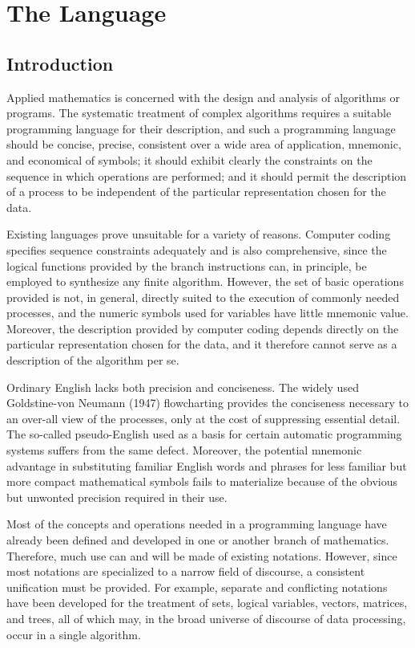 
\chapter{The Language}

\section{Introduction}

\par Applied mathematics is concerned with the design and analysis of algorithms or programs. The systematic treatment of complex algorithms requires a suitable programming language for their description, and such a programming language should be concise, precise, consistent over a wide area of application, mnemonic, and economical of symbols; it should exhibit clearly the constraints on the sequence in which operations are performed; and it should permit the description of a process to be independent of the particular representation chosen for the data.

\par Existing languages prove unsuitable for a variety of reasons. Computer coding specifies sequence constraints adequately and is also comprehensive, since the logical functions provided by the branch instructions can, in principle, be employed to synthesize any finite algorithm. However, the set of basic operations provided is not, in general, directly suited to the execution of commonly needed processes, and the numeric symbols used for variables have little mnemonic value. Moreover, the description provided by computer coding depends directly on the particular representation chosen for the data, and it therefore cannot serve as a description of the algorithm per se.

\par Ordinary English lacks both precision and conciseness. The widely used Goldstine-von Neumann (1947) flowcharting provides the conciseness necessary to an over-all view of the processes, only at the cost of suppressing essential detail. The so-called pseudo-English used as a basis for certain automatic programming systems suffers from the same defect. Moreover, the potential mnemonic advantage in substituting familiar English words and phrases for less familiar but more compact mathematical symbols fails to materialize because of the obvious but unwonted precision required in their use.

\par Most of the concepts and operations needed in a programming language have already been defined and developed in one or another branch of mathematics. Therefore, much use can and will be made of existing notations. However, since most notations are specialized to a narrow field of discourse, a consistent unification must be provided. For example, separate and conflicting notations have been developed for the treatment of sets, logical variables, vectors, matrices, and trees, all of which may, in the broad universe of discourse of data processing, occur in a single algorithm. 

